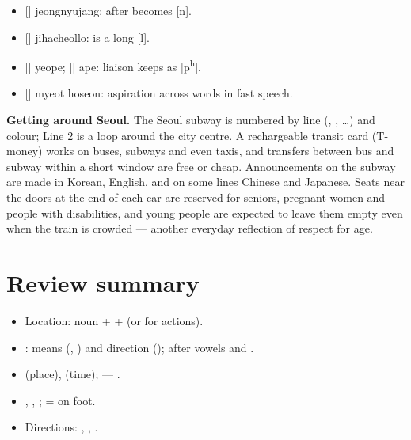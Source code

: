 \begin{itemize}
  \item {} [] jeongnyujang:  after  becomes [n].
  \item {} [] jihacheollo:  is a long [l].
  \item {} [] yeope;  [] ape: liaison keeps  as
        [p\textsuperscript{h}].
  \item {} [] myeot hoseon: aspiration across words in fast speech.
\end{itemize}

\begin{aside}
\textbf{Getting around Seoul.} The Seoul subway is numbered by line (,
, \ldots) and colour; Line 2 is a loop around the city centre. A rechargeable
transit card (T-money) works on buses, subways and even taxis, and transfers between bus
and subway within a short window are free or cheap. Announcements on the subway are made
in Korean, English, and on some lines Chinese and Japanese. Seats near the doors at the
end of each car are reserved for seniors, pregnant women and people with disabilities,
and young people are expected to leave them empty even when the train is crowded ---
another everyday reflection of respect for age.
\end{aside}

\section*{Review summary}
\begin{itemize}
  \item Location: noun +  +  (or
         for actions).
  \item {}: means (, ) and direction
        ();  after vowels and .
  \item {} (place),  (time); 
        --- .
  \item {}, , ;  = on foot.
  \item Directions: , , .
\end{itemize}
